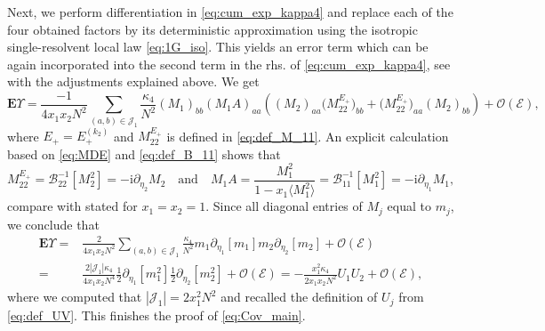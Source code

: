 \documentclass[10pt]{amsart}
\numberwithin{equation}{section}
\newcommand{\E}{\mathbf{E}}
\newcommand{\ii}{\mathrm{i}}
\begin{document}
Next, we perform differentiation in \eqref{eq:cum_exp_kappa4} and replace each of the four obtained factors by its deterministic approximation using the isotropic single-resolvent local law \eqref{eq:1G_iso}. This yields an error term which can be again incorporated into the second term in the rhs. of \eqref{eq:cum_exp_kappa4}, see \cite[Eq.(7.18)-(7.19)]{hyperuniformity} with the adjustments explained above. We get
\begin{equation}
\E\Upsilon =\frac{-1}{4x_1x_2N^2}\sum_{(a,b)\in\mathcal{J}_1} \frac{\kappa_4}{N^2} (M_1)_{bb}(M_1A)_{aa}\!\!\left(\!(M_2)_{aa}\big(M_{22}^{E_+}\big)_{bb}\! +\! \big(M_{22}^{E_+}\big)_{aa}(M_2)_{bb}\right) +\mathcal{O}\left(\mathcal{E}\right)\!,
\label{eq:cum_exp_kappa4_determ}
\end{equation}
where $E_+=E_+^{(k_2)}$ and $M_{22}^{E_+}$ is defined in \eqref{eq:def_M_11}. An explicit calculation based on \eqref{eq:MDE} and \eqref{eq:def_B_11} shows that
\begin{equation}
M_{22}^{E_+} = \mathcal{B}_{22}^{-1}[M_2^2]= -\ii\partial_{\eta_2} M_2\quad\text{and}\quad M_1A=\frac{M_1^2}{1-x_1\langle M_1^2\rangle}=\mathcal{B}_{11}^{-1}[M_1^2]=-\ii\partial_{\eta_1} M_1,
\label{eq:MA}
\end{equation}
compare with \cite[Eq.(7.21)]{hyperuniformity} stated for $x_1=x_2=1$. Since all diagonal entries of $M_j$ equal to $m_j$, we conclude that 
\begin{equation}
\begin{split}
\E\Upsilon =&\frac{2}{4x_1x_2N^2}\sum_{(a,b)\in\mathcal{J}_1} \frac{\kappa_4}{N^2} m_1 \partial_{\eta_1}[m_1] m_2 \partial_{\eta_2}[m_2]  +\mathcal{O}\left(\mathcal{E}\right)\\
=&\frac{2|\mathcal{J}_1|\kappa_4}{4x_1x_2N^4} \frac{1}{2}\partial_{\eta_1}[m_1^2]\frac{1}{2}\partial_{\eta_2}[m_2^2]+\mathcal{O}(\mathcal{E}) = -\frac{x^2_1\kappa_4}{2x_1x_2N^2}U_1U_2 +\mathcal{O}(\mathcal{E}),
\end{split}
\label{eq:cum_exp_kappa4_determ}
\end{equation}
where we computed that $|\mathcal{J}_1|=2x_1^2N^2$ and recalled the definition of $U_j$ from \eqref{eq:def_UV}. This finishes the proof of \eqref{eq:Cov_main}.
\end{document}
